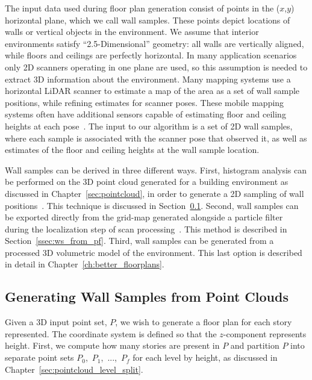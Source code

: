 \documentclass[12pt,onecolumn,oneside]{book}
\begin{document}
The input data used during floor plan generation consist of points in the ($x$,$y$) horizontal plane, which we call wall samples.  These points depict locations of walls or vertical objects in the environment.  We assume that interior environments satisfy ``2.5-Dimensional'' geometry:  all walls are vertically aligned, while floors and ceilings are perfectly horizontal.  In many application scenarios only 2D scanners operating in one plane are used, so this assumption is needed to extract 3D information about the environment.  Many mapping systems use a horizontal LiDAR scanner to estimate a map of the area as a set of wall sample positions, while refining estimates for scanner poses.  These mobile mapping systems often have additional sensors capable of estimating floor and ceiling heights at each pose~\cite{Backpack,Quadrotor}.  The input to our algorithm is a set of 2D wall samples, where each sample is associated with the scanner pose that observed it, as well as estimates of the floor and ceiling heights at the wall sample location.

Wall samples can be derived in three different ways.  First, histogram analysis can be performed on the 3D point cloud generated for a building environment as discussed in Chapter~\ref{sec:pointcloud}, in order to generate a 2D sampling of wall positions~\cite{Turner12}.  This technique is discussed in Section~\ref{ssec:ws_from_pc}.  Second, wall samples can be exported directly from the grid-map generated alongside a particle filter during the localization step of scan processing~\cite{NickJournal,Turner14}.  This method is described in Section~\ref{ssec:ws_from_pf}.  Third, wall samples can be generated from a processed 3D volumetric model of the environment.  This last option is described in detail in Chapter~\ref{ch:better_floorplans}.

\subsection{Generating Wall Samples from Point Clouds}
\label{ssec:ws_from_pc}

Given a 3D input point set, $P$, we wish to generate a floor plan for each story represented.  The coordinate system is defined so that the $z$-component represents height.  First, we compute how many stories are present in $P$ and partition $P$ into separate point sets $P_0$,~$P_1$,~...,~$P_f$ for each level by height, as discussed in Chapter~\ref{sec:pointcloud_level_split}.
\end{document}
